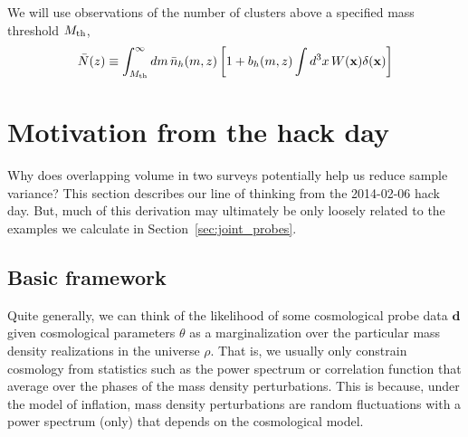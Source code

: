 \documentclass[preprint]{aastex}
\newcommand{\xv}{\mathbf{x}}
\newcommand{\data}{\mathbf{d}}
\newcommand{\nbar}{\bar{n}}
\newcommand{\mth}{M_{\rm th}}
\begin{document}
We will use observations of the number of clusters above a 
specified mass threshold $\mth$,
\begin{equation}
	\bar{N}(z) \equiv
	\int_{\mth}^{\infty} dm\, 
	\nbar_{h}(m,z)
	\left[
	1 + b_{h}(m,z)
	\int d^{3}x\, W(\xv) \delta(\xv)
	\right]
\end{equation}







\appendix
\section{Motivation from the hack day}

Why does overlapping volume in two surveys potentially help us reduce sample variance?
This section describes our line of thinking from the 2014-02-06 hack day. 
But, much of this derivation may ultimately be only loosely related to the examples
we calculate in Section~\ref{sec:joint_probes}.

\subsection{Basic framework}
Quite generally, we can think of the likelihood of some cosmological probe data $\data$ given cosmological 
parameters $\theta$ as a marginalization over the particular mass density realizations in the universe $\rho$.
That is, we usually only constrain cosmology from statistics such as the power spectrum or correlation 
function that average over the phases of the mass density perturbations. This is because, under the model 
of inflation, mass density perturbations are random fluctuations with a power spectrum (only) that depends 
on the cosmological model.
\end{document}
